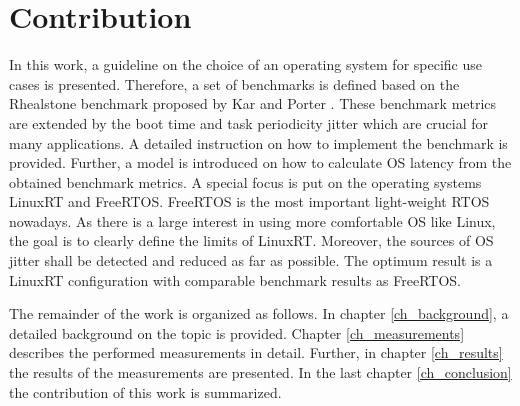 \section{Contribution}
In this work, a guideline on the choice of an operating system for specific use cases is presented.
Therefore, a set of benchmarks is defined based on the Rhealstone benchmark proposed by Kar and Porter \cite{kar:itrb} \cite{kar:artbp}. 
These benchmark metrics are extended by the boot time and task periodicity jitter which are crucial for many applications.
A detailed instruction on how to implement the benchmark is provided.
Further, a model is introduced on how to calculate OS latency from the obtained benchmark metrics. 
A special focus is put on the operating systems LinuxRT and FreeRTOS. 
FreeRTOS is the most important light-weight \ac{RTOS} nowadays.
As there is a large interest in using more comfortable \ac{OS} like Linux, the goal is to clearly define the limits of LinuxRT.
Moreover, the sources of OS jitter shall be detected and reduced as far as possible. 
The optimum result is a LinuxRT configuration with comparable benchmark results as FreeRTOS. 

\par
The remainder of the work is organized as follows. In chapter \ref{ch_background}, a detailed background on the topic is provided. 
Chapter \ref{ch_measurements} describes the performed measurements in detail. 
Further, in chapter \ref{ch_results} the results of the measurements are presented. 
In the last chapter \ref{ch_conclusion} the contribution of this work is summarized.